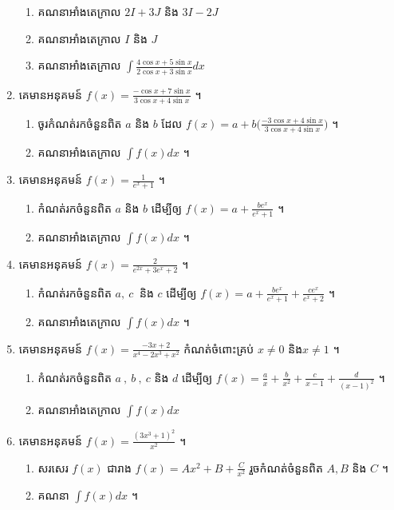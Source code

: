 \documentclass[12pt, a4paper]{article}
\begin{document}
\begin{enumerate}[m]
	\begin{enumerate}[k]
		\item គណនាអាំងតេក្រាល $2I+3J$ និង $3I-2J$
		\item គណនាអាំងតេក្រាល $I$ និង $J$
		\item គណនាអាំងតេក្រាល $\int \frac{4\cos x+5\sin x}{2\cos x +3\sin x} dx$
	\end{enumerate}
	\item គេមានអនុគមន៍ $f(x)=\frac{-\cos x+7\sin x}{3\cos x+4\sin x}$ ។
	\begin{enumerate}[k]
		\item ចូរកំណត់រកចំនួនពិត $a$ និង $b$ ដែល $f(x)=a+b\bigg(\frac{-3\cos x+4\sin x}{3\cos x+4\sin x}\bigg)$ ។
		\item គណនាអាំងតេក្រាល $\int f(x) dx$ ។
	\end{enumerate}
	\item គេមានអនុគមន៍ $f(x)=\frac{1}{e^x+1}$ ។
	\begin{enumerate}[k]
		\item កំណត់រកចំនួនពិត $a$ និង $b$ ដើម្បីឲ្យ $f(x)=a+\frac{be^x}{e^x+1}$ ។
		\item គណនាអាំងតេក្រាល $\int f(x) dx$ ។
	\end{enumerate}
	\item គេមានអនុគមន៍ $f(x)=\frac{2}{e^{2x}+3e^x+2}$ ។
	\begin{enumerate}[k]
		\item កំណត់រកចំនួនពិត $a, ~c~$ និង $c$ ដើម្បីឲ្យ $f(x)=a+\frac{be^x}{e^x+1}+\frac{ce^x}{e^x+2}$ ។
		\item គណនាអាំងតេក្រាល $\int f(x) dx$ ។
	\end{enumerate}
	\item គេមានអនុគមន៍ $f(x)=\frac{-3x+2}{x^4-2x^3+x^2}$ កំណត់ចំពោះគ្រប់ $x\neq0$ និង$x\neq1$ ។
	\begin{enumerate}[k]
		\item កំណត់រកចំនួនពិត $a~,~b~,~c$ និង $d$ ដើម្បីឲ្យ $f(x)=\frac{a}{x}+\frac{b}{x^2}+\frac{c}{x-1}+\frac{d}{(x-1)^2}$ ។
		\item គណនាអាំងតេក្រាល $\int f(x) dx$ 
	\end{enumerate}
	\item គេមានអនុគមន៍ $f(x)=\frac{(3x^3+1)^2}{x^2}$ ។
	\begin{enumerate}[k]
		\item សរសេរ $f(x)$ ជារាង $f(x)=Ax^2+B+\frac{C}{x^2}$ រួចកំណត់ចំនួនពិត $A, B$ និង $C$ ។
		\item គណនា $\int f(x) dx$ ។
	\end{enumerate}

\end{enumerate}
\end{document}
